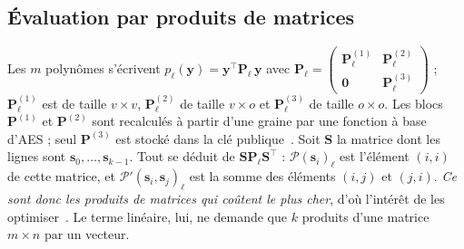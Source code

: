 \subsection{Évaluation par produits de matrices}
Les $m$ polynômes s'écrivent $p_\ell(\mathbf{y})=\mathbf{y}^{\top}\mathbf{P}_\ell\,\mathbf{y}$ avec $\mathbf{P}_\ell=\begin{pmatrix}\mathbf{P}^{(1)}_\ell&\mathbf{P}^{(2)}_\ell\\\mathbf{0}&\mathbf{P}^{(3)}_\ell\end{pmatrix}$ ; $\mathbf{P}^{(1)}_\ell$ est de taille $v\times v$, $\mathbf{P}^{(2)}_\ell$ de taille $v\times o$ et $\mathbf{P}^{(3)}_\ell$ de taille $o\times o$. Les blocs $\mathbf{P}^{(1)}$ et $\mathbf{P}^{(2)}$ sont recalculés à partir d'une graine par une fonction à base d'AES ; seul $\mathbf{P}^{(3)}$ est stocké dans la clé publique~\cite{nibbling}. Soit $\mathbf{S}$ la matrice dont les lignes sont $\mathbf{s}_0,\dots,\mathbf{s}_{k-1}$. Tout se déduit de $\mathbf{S}\mathbf{P}_\ell\mathbf{S}^{\top}$ : $\mathcal{P}(\mathbf{s}_i)_\ell$ est l'élément $(i,i)$ de cette matrice, et $\mathcal{P}'(\mathbf{s}_i,\mathbf{s}_j)_\ell$ est la somme des éléments $(i,j)$ et $(j,i)$. \emph{Ce sont donc les produits de matrices qui coûtent le plus cher}, d'où l'intérêt de les optimiser~\cite{nibbling}. Le terme linéaire, lui, ne demande que $k$ produits d'une matrice $m\times n$ par un vecteur.

